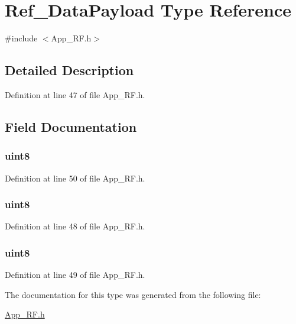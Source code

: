 \hypertarget{type_ref___data_payload}{
\section{Ref\_\-DataPayload Type Reference}
\label{type_ref___data_payload}
}


{\ttfamily \#include $<$App\_\-RF.h$>$}

\par
\par


\subsection{Detailed Description}


Definition at line 47 of file App\_\-RF.h.



\subsection{Field Documentation}
\hypertarget{type_ref___data_payload_aae55f3dfbe154a6cc9f4550e48ad4718}{
\subsubsection[{Ref\_\-Node}]{ {\bfseries uint8 } }}
\label{type_ref___data_payload_aae55f3dfbe154a6cc9f4550e48ad4718}


Definition at line 50 of file App\_\-RF.h.

\hypertarget{type_ref___data_payload_a0b368d20ae77d81b17d39d88e68b8b5d}{
\subsubsection[{X\_\-Coord}]{ {\bfseries uint8 } }}
\label{type_ref___data_payload_a0b368d20ae77d81b17d39d88e68b8b5d}


Definition at line 48 of file App\_\-RF.h.

\hypertarget{type_ref___data_payload_ac6e50173777219aa209238531119fb2b}{
\subsubsection[{Y\_\-Coord}]{ {\bfseries uint8 } }}
\label{type_ref___data_payload_ac6e50173777219aa209238531119fb2b}


Definition at line 49 of file App\_\-RF.h.



The documentation for this type was generated from the following file:\begin{DoxyCompactItemize}
\item 
\hyperlink{_app___r_f_8h}{App\_\-RF.h}\end{DoxyCompactItemize}
